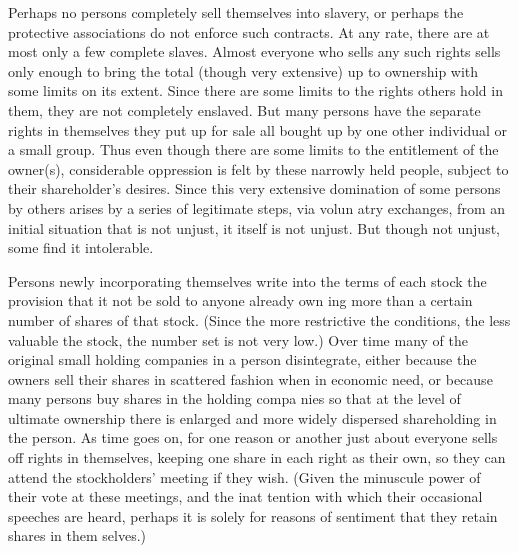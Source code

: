 \documentclass[11pt,openany]{book}
\begin{document}
Perhaps no persons completely sell themselves into slavery, or perhaps the protective associations do not enforce such contracts. At any rate, there are at most only a few complete slaves. Almost everyone who sells any such rights sells only enough to bring the total (though very extensive) up to ownership with some limits on its extent. Since there are some limits to the rights others hold in them, they are not completely enslaved. But many persons have the separate rights in themselves they put up for sale all bought up by one other individual or a small group. Thus even though there are some limits to the entitlement of the owner(s), considerable oppression is felt by these narrowly held people, subject to their shareholder's desires. Since this very extensive domination of some persons by others arises by a series of legitimate steps, via volun atry exchanges, from an initial situation that is not unjust, it itself is not unjust. But though not unjust, some find it intolerable. 

Persons newly incorporating themselves write into the terms of each stock the provision that it not be sold to anyone already own ing more than a certain number of shares of that stock. (Since the more restrictive the conditions, the less valuable the stock, the number set is not very low.) Over time many of the original small holding companies in a person disintegrate, either because the owners sell their shares in scattered fashion when in economic need, or because many persons buy shares in the holding compa nies so that at the level of ultimate ownership there is enlarged and more widely dispersed shareholding in the person. As time goes on, for one reason or another just about everyone sells off rights in themselves, keeping one share in each right as their own, so they can attend the stockholders' meeting if they wish. (Given the minuscule power of their vote at these meetings, and the inat tention with which their occasional speeches are heard, perhaps it is solely for reasons of sentiment that they retain shares in them selves.) 
\end{document}
